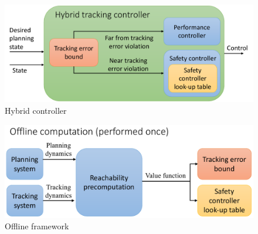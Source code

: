 \begin{figure}[h!]
  \includegraphics[width=\columnwidth]{fig/hybrid_controller}
  \caption{Hybrid controller}
  \label{fig:hybrid_ctrl}
  \vspace{-.2in}
\end{figure}

\begin{figure}[h!]
  \includegraphics[width=\columnwidth]{fig/framework_offline}
  \caption{Offline framework}
  \label{fig:fw_offline}
  \vspace{-.2in}
\end{figure}